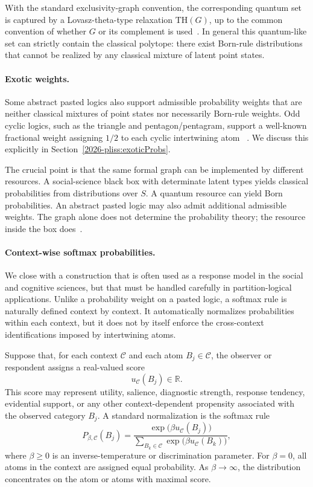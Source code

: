 \documentclass[aps,pra,twocolumn,superscriptaddress,floatfix,longbibliography]{revtex4-2}
\begin{document}
With the standard exclusivity-graph convention, the corresponding
quantum set is captured by a Lovasz-theta-type relaxation
$\mathrm{TH}(G)$, up to the common convention of whether $G$ or its
complement is used~\cite{GroetschelLovaszSchrijver1986}. In general
this quantum-like set can strictly contain the classical polytope:
there exist Born-rule distributions that cannot be realized by any
classical mixture of latent point states.

\paragraph{Exotic weights.}
Some abstract pasted logics also support admissible probability
weights that are neither classical mixtures of point states nor
necessarily Born-rule weights. Odd cyclic logics, such as the
triangle and pentagon/pentagram, support a well-known fractional
weight assigning $1/2$ to each cyclic intertwining atom
~\cite{greechie-1974,wright:pent}. We discuss this explicitly in
Section~\ref{2026-pliss:exoticProbs}.

The crucial point is that the same formal graph can be implemented
by different resources. A social-science black box with determinate
latent types yields classical probabilities from distributions over
$S$. A quantum resource can yield Born probabilities. An abstract
pasted logic may also admit additional admissible weights. The graph
alone does not determine the probability theory; the resource inside
the box does~\cite{svozil-2018-b}.


\paragraph{Context-wise softmax probabilities.}
We close with a construction that is often used as a response model in
the social and cognitive sciences, but that must be handled carefully
in partition-logical applications. Unlike a probability weight on a
pasted logic, a softmax rule is naturally defined context by context.
It automatically normalizes probabilities within each context, but it
does not by itself enforce the cross-context identifications imposed
by intertwining atoms.

Suppose that, for each context \(\mathcal C\) and each atom
\(B_j\in\mathcal C\), the observer or respondent assigns a real-valued
score
\[
u_{\mathcal C}(B_j)\in\mathbb R .
\]
This score may represent utility, salience, diagnostic strength,
response tendency, evidential support, or any other context-dependent
propensity associated with the observed category \(B_j\). A standard
normalization is the softmax rule
\begin{equation}
P_{\beta,\mathcal C}(B_j)
=
\frac{\exp\bigl(\beta u_{\mathcal C}(B_j)\bigr)}
{\sum_{B_k\in\mathcal C}
 \exp\bigl(\beta u_{\mathcal C}(B_k)\bigr)} ,
\label{eq:softmax}
\end{equation}
where \(\beta\geq 0\) is an inverse-temperature or discrimination
parameter. For \(\beta=0\), all atoms in the context are assigned
equal probability. As \(\beta\to\infty\), the distribution
concentrates on the atom or atoms with maximal score.
\end{document}
